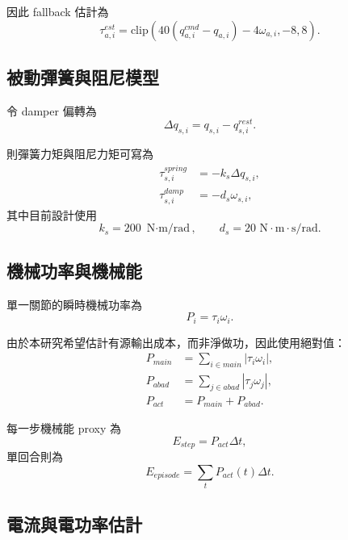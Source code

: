 \documentclass[12pt,a4paper,UTF8]{ctexart}
\begin{document}
因此 fallback 估計為
\begin{equation}
\tau^{est}_{a,i} =
\mathrm{clip}\left(
40(q^{cmd}_{a,i} - q_{a,i}) - 4\omega_{a,i}, -8, 8
\right).
\end{equation}

\subsection{被動彈簧與阻尼模型}

令 damper 偏轉為
\begin{equation}
\Delta q_{s,i} = q_{s,i} - q^{rest}_{s,i}.
\end{equation}

則彈簧力矩與阻尼力矩可寫為
\begin{align}
\tau^{spring}_{s,i} &= -k_s \Delta q_{s,i}, \\
\tau^{damp}_{s,i} &= -d_s \omega_{s,i},
\end{align}
其中目前設計使用
\begin{equation}
k_s = 200 \text{ N$\cdot$m/rad}, \qquad d_s = 20 \text{ N$\cdot$m$\cdot$s/rad}.
\end{equation}

\subsection{機械功率與機械能}

單一關節的瞬時機械功率為
\begin{equation}
P_i = \tau_i \omega_i.
\end{equation}

由於本研究希望估計有源輸出成本，而非淨做功，因此使用絕對值：
\begin{align}
P_{main} &= \sum_{i \in main} |\tau_i \omega_i|, \\
P_{abad} &= \sum_{j \in abad} |\tau_j \omega_j|, \\
P_{act} &= P_{main} + P_{abad}.
\end{align}

每一步機械能 proxy 為
\begin{equation}
E_{step} = P_{act}\Delta t,
\end{equation}
單回合則為
\begin{equation}
E_{episode} = \sum_t P_{act}(t)\Delta t.
\end{equation}

\subsection{電流與電功率估計}
\end{document}
